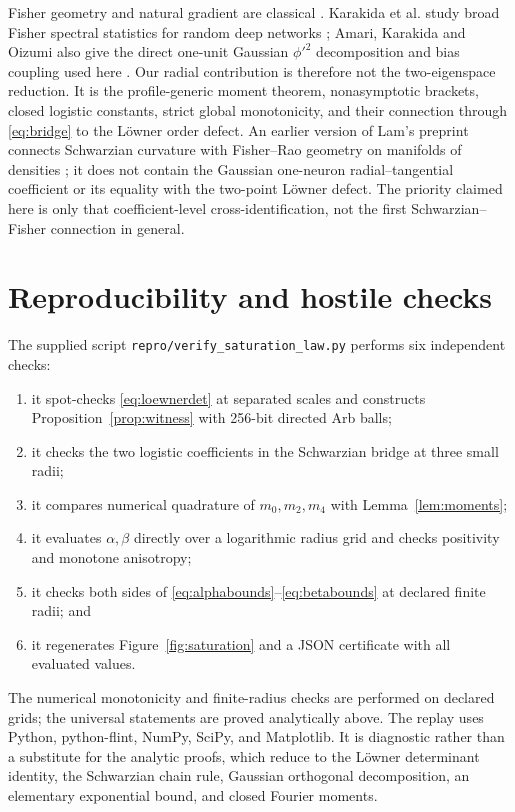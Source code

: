 \documentclass[11pt]{article}
\begin{document}
Fisher geometry and natural gradient are classical \cite{amari1998}.  Karakida et al. study broad Fisher spectral
statistics for random deep networks \cite{karakida2019}; Amari, Karakida and Oizumi also give the direct one-unit
Gaussian $\phi'^2$ decomposition and bias coupling used here \cite{amari2019}.  Our radial contribution is
therefore not the two-eigenspace reduction.  It is the profile-generic moment theorem, nonasymptotic brackets,
closed logistic constants, strict global monotonicity, and their connection through \eqref{eq:bridge} to the
L\"owner order defect.  An earlier version of Lam's preprint connects Schwarzian curvature with Fisher--Rao
geometry on manifolds of densities \cite{lam2026}; it does not contain the Gaussian one-neuron
radial--tangential coefficient or its equality with the two-point L\"owner defect.  The priority claimed here is
only that coefficient-level cross-identification, not the first Schwarzian--Fisher connection in general.

\section{Reproducibility and hostile checks}

The supplied script \texttt{repro/verify\_saturation\_law.py} performs six independent checks:
\begin{enumerate}[leftmargin=2em]
 \item it spot-checks \eqref{eq:loewnerdet} at separated scales and constructs Proposition~\ref{prop:witness} with
 256-bit directed Arb balls;
 \item it checks the two logistic coefficients in the Schwarzian bridge at three small radii;
 \item it compares numerical quadrature of $m_0,m_2,m_4$ with Lemma~\ref{lem:moments};
 \item it evaluates $\alpha,\beta$ directly over a logarithmic radius grid and checks positivity and monotone
 anisotropy;
 \item it checks both sides of \eqref{eq:alphabounds}--\eqref{eq:betabounds} at declared finite radii; and
 \item it regenerates Figure~\ref{fig:saturation} and a JSON certificate with all evaluated values.
\end{enumerate}
The numerical monotonicity and finite-radius checks are performed on declared grids; the universal statements are
proved analytically above.  The replay uses Python, python-flint, NumPy, SciPy, and Matplotlib.  It is diagnostic
rather than a substitute for
the analytic proofs, which reduce to the L\"owner determinant identity, the Schwarzian chain rule, Gaussian
orthogonal decomposition, an elementary exponential bound, and closed Fourier moments.
\end{document}
